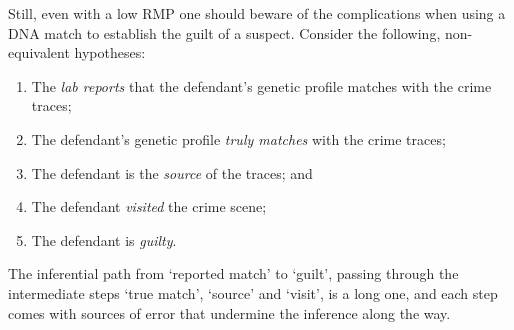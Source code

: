 \documentclass[10pt]{article}
\begin{document}
Still, even with a low RMP one should beware of the complications when using a DNA match to establish the guilt of a suspect. Consider the following, non-equivalent hypotheses: %

\begin{enumerate}

	\item 
The \textit{lab reports} that the defendant's 
genetic profile matches with the crime traces;

	\item 
The defendant's genetic profile \textit{truly matches} with the crime traces; 

	\item 
The defendant is the \textit{source} of the traces; and


	\item 
The defendant \textit{visited} the crime scene; 


	\item 
The defendant is \textit{guilty}.
\end{enumerate}

\noindent
The inferential path from `reported match'  
to `guilt', passing through the intermediate steps `true match', `source' and `visit', is a long one, 
and each step comes with sources of error that undermine the inference along the way.  
\end{document}
